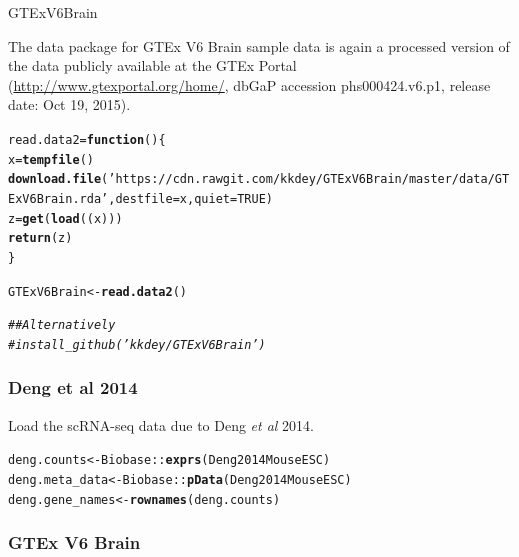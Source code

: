 \documentclass[12pt]{article}\usepackage[]{graphicx}\usepackage[usenames,dvipsnames]{color}
\makeatletter
\newcommand{\hlnum}[1]{\textcolor[rgb]{0.686,0.059,0.569}{#1}}%
\newcommand{\hlstr}[1]{\textcolor[rgb]{0.192,0.494,0.8}{#1}}%
\newcommand{\hlcom}[1]{\textcolor[rgb]{0.678,0.584,0.686}{\textit{#1}}}%
\newcommand{\hlopt}[1]{\textcolor[rgb]{0,0,0}{#1}}%
\newcommand{\hlstd}[1]{\textcolor[rgb]{0.345,0.345,0.345}{#1}}%
\newcommand{\hlkwa}[1]{\textcolor[rgb]{0.161,0.373,0.58}{\textbf{#1}}}%
\newcommand{\hlkwb}[1]{\textcolor[rgb]{0.69,0.353,0.396}{#1}}%
\newcommand{\hlkwc}[1]{\textcolor[rgb]{0.333,0.667,0.333}{#1}}%
\newcommand{\hlkwd}[1]{\textcolor[rgb]{0.737,0.353,0.396}{\textbf{#1}}}%
\newenvironment{kframe}{%
 \def\at@end@of@kframe{}%
 \ifinner\ifhmode%
  \def\at@end@of@kframe{\end{minipage}}%
  \begin{minipage}{\columnwidth}%
 \fi\fi%
 \def\FrameCommand##1{\hskip\@totalleftmargin \hskip-\fboxsep
 \colorbox{shadecolor}{##1}\hskip-\fboxsep
     \hskip-\linewidth \hskip-\@totalleftmargin \hskip\columnwidth}%
 \MakeFramed {\advance\hsize-\width
   \@totalleftmargin\z@ \linewidth\hsize
   \@setminipage}}%
 {\par\unskip\endMakeFramed%
 \at@end@of@kframe}
\newenvironment{knitrout}{}{} %
\makeatother
\begin{document}
\begin{verb} GTExV6Brain \end{verb} The data package for GTEx V6 Brain sample data is again a processed version of the data publicly available at the GTEx Portal (\url{http://www.gtexportal.org/home/}, dbGaP accession phs000424.v6.p1, release date: Oct 19, 2015).

\begin{knitrout}
\color{fgcolor}\begin{kframe}
\begin{alltt}
\hlstd{read.data2} \hlkwb{=} \hlkwa{function}\hlstd{() \{}
  \hlstd{x} \hlkwb{=} \hlkwd{tempfile}\hlstd{()}
  \hlkwd{download.file}\hlstd{(}\hlstr{'https://cdn.rawgit.com/kkdey/GTExV6Brain/master/data/GTExV6Brain.rda'}\hlstd{,} \hlkwc{destfile} \hlstd{= x,} \hlkwc{quiet}\hlstd{=}\hlnum{TRUE}\hlstd{)}
  \hlstd{z} \hlkwb{=} \hlkwd{get}\hlstd{(}\hlkwd{load}\hlstd{((x)))}
  \hlkwd{return}\hlstd{(z)}
\hlstd{\}}

\hlstd{GTExV6Brain} \hlkwb{<-} \hlkwd{read.data2}\hlstd{()}

\hlcom{## Alternatively}
\hlcom{# install_github('kkdey/GTExV6Brain')}
\end{alltt}
\end{kframe}
\end{knitrout}

\subsubsection{Deng et al 2014}

Load the scRNA-seq data due to Deng \textit{et al} 2014.

\begin{knitrout}
\color{fgcolor}\begin{kframe}
\begin{alltt}
\hlstd{deng.counts} \hlkwb{<-} \hlstd{Biobase}\hlopt{::}\hlkwd{exprs}\hlstd{(Deng2014MouseESC)}
\hlstd{deng.meta_data} \hlkwb{<-} \hlstd{Biobase}\hlopt{::}\hlkwd{pData}\hlstd{(Deng2014MouseESC)}
\hlstd{deng.gene_names} \hlkwb{<-} \hlkwd{rownames}\hlstd{(deng.counts)}
\end{alltt}
\end{kframe}
\end{knitrout}

\subsubsection{GTEx V6 Brain}
\end{document}
